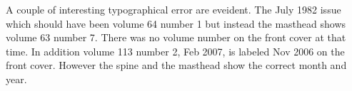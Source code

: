 A couple of interesting typographical error are eveident. The July
1982 issue which should have been volume 64 number 1 but instead the
masthead shows volume 63 number 7. There was no volume number on the
front cover at that time. In addition volume 113 number 2, Feb 2007,
is labeled Nov 2006 on the front cover. However the spine and the
masthead show the correct month and year.

